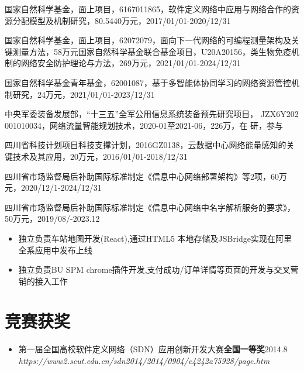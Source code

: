 \documentclass{resume}
\begin{document}
国家自然科学基金，面上项目，6167011865，软件定义网络中应用与网络合作的资源分配模型及机制研究，80.5440万元，2017/01/01-2020/12/31

国家自然科学基金，面上项目，62072079，面向下一代网络的可编程测量架构及关键测量方法，58万元国家自然科学基金联合基金项目，U20A20156，类生物免疫机制的网络安全防护理论与方法，269万元，2021/01/01-2024/12/31

国家自然科学基金青年基金，62001087，基于多智能体协同学习的网络资源管控机制研究，24万元，2021/01/01-2023/12/31

中央军委装备发展部，“十三五”全军公用信息系统装备预先研究项目， JZX6Y202 001010034，网络流量智能规划技术，2020-01至2021-06，226万，在 研，参与

四川省科技计划项目科技支撑计划，2016GZ0138，云数据中心网络能量感知的关键技术及其应用，20万元，2016/01/01-2018/12/31

四川省市场监督局后补助国际标准制定《信息中心网络部署架构》等2项，60万元，2020/12/1-2024/12/31

四川省市场监督局后补助国际标准制定《信息中心网络中名字解析服务的要求》，50万元，2019/08/-2023.12
\begin{itemize}
  \item 独立负责车站地图开发(React),通过HTML5 本地存储及JSBridge实现在阿里全系应用中发布上线
  \item 独立负责BU SPM chrome插件开发,支付成功/订单详情等页面的开发与交叉营销的接入工作
\end{itemize}



\section{竞赛获奖}
\begin{itemize}[parsep=0.2ex]
  \item 第一届全国高校软件定义网络（SDN）应用创新开发大赛\textbf{全国一等奖}2014.8\\ \textit{https://www2.scut.edu.cn/sdn2014/2014/0904/c4242a75928/page.htm}
\end{itemize}

\end{document}
